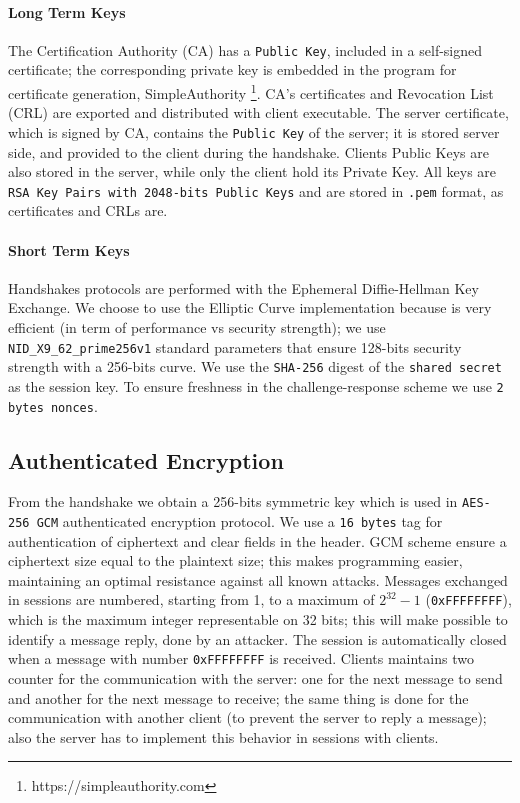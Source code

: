 \documentclass[11pt]{report}
\begin{document}
\paragraph*{Long Term Keys}
The Certification Authority (CA) has a \texttt{Public Key}, included in a self-signed
certificate; the corresponding private key is embedded in the program for certificate generation, 
SimpleAuthority \footnote{https://simpleauthority.com}.
CA's certificates and Revocation List (CRL) are exported and distributed with client executable.
The server certificate, which is signed by CA, contains the \texttt{Public Key} of the server; it
is stored server side, and provided to the client during the handshake.
Clients Public Keys are also stored in the server, while only the client hold its Private Key.
All keys are \texttt{RSA Key Pairs with 2048-bits Public Keys} and are stored in \texttt{.pem} format, as certificates and CRLs are.
\paragraph*{Short Term Keys}
Handshakes protocols are performed with the Ephemeral Diffie-Hellman Key Exchange. 
We choose to use the Elliptic Curve implementation because is very efficient (in term of performance vs security strength);
we use \verb|NID_X9_62_prime256v1| standard parameters that ensure 128-bits security strength with a 256-bits curve. We use the \texttt{SHA-256} digest of the \texttt{shared secret} as
the session key.
To ensure freshness in the challenge-response scheme we use \texttt{2 bytes nonces}.
\subsection{Authenticated Encryption}
From the handshake we obtain a 256-bits symmetric key which is used in \texttt{AES-256 GCM} authenticated encryption protocol.
We use a \texttt{16 bytes} tag for authentication of ciphertext and clear fields in the header. GCM scheme ensure a ciphertext
size equal to the plaintext size; this makes programming easier, maintaining an optimal resistance against all known attacks.
Messages exchanged in sessions are numbered, starting from 1, to a maximum of $2^{32}-1$ (\verb|0xFFFFFFFF|), which is the
maximum integer representable on 32 bits; this will make possible to identify a message reply, done
by an attacker. The session is automatically closed when a message with number \verb|0xFFFFFFFF| is received.
Clients maintains two counter for the communication with the server:  one for the next message to send and another for
the next message to receive; the same thing is done for the communication with another client (to prevent the server to 
reply a message); also the server has to implement this behavior in sessions with clients.
\end{document}
